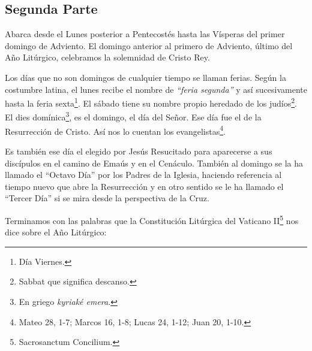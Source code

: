 \documentclass[letterpaper, 12pt]{book}
\begin{document}
        \subsection{Segunda Parte}
        Abarca desde el Lunes posterior a Pentecost\'es hasta las V\'isperas del primer domingo de Adviento. El domingo anterior al primero de Adviento, \'ultimo del A\~no Lit\'urgico, celebramos la solemnidad de Cristo Rey.\newline

    Los d\'ias que no son domingos de cualquier tiempo se llaman ferias. Seg\'un la costumbre latina, el lunes recibe el nombre de \textit{``feria segunda''} y as\'i sucesivamente hasta la feria sexta\footnote{D\'ia Viernes.}. El s\'abado tiene su nombre propio heredado de los jud\'ios\footnote{Sabbat que significa descanso.}. El dies dom\'inica\footnote{En griego \textit{kyriak\'e emera}.}, es el domingo, el día del Se\~nor. Ese d\'ia fue el de la Resurrecci\'on de Cristo. As\'i nos lo cuentan los evangelistas\footnote{Mateo 28, 1-7; Marcos 16, 1-8; Lucas 24, 1-12; Juan 20, 1-10.}.\newline
    
    Es tambi\'en ese d\'ia el elegido por Jes\'us Resucitado para aparecerse a sus disc\'ipulos en el camino de Ema\'us y en el Cen\'aculo. Tambi\'en al domingo se la ha llamado el ``Octavo D\'ia'' por los Padres de la Iglesia, haciendo referencia al tiempo nuevo que abre la Resurrecci\'on y en otro sentido se le ha llamado el ``Tercer D\'ia'' si se mira desde la perspectiva de la Cruz.\newline
    
    Terminamos con las palabras que la Constituci\'on Lit\'urgica del Vaticano II\footnote{Sacrosanctum Concilium.} nos dice sobre el A\~no Lit\'urgico:\newline
    
\end{document}
